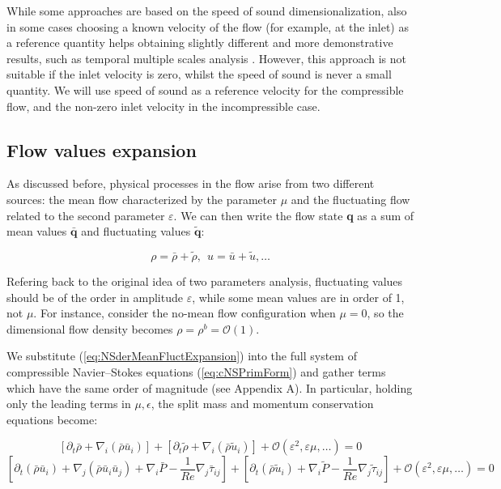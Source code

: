 While some approaches \cite{culick2006unsteady} are based on the speed of sound dimensionalization, also in some cases choosing a known velocity of the flow (for example, at the inlet) as a reference quantity helps obtaining slightly different and more demonstrative results, such as temporal multiple scales analysis \cite{Muller99lowmach}. However, this approach is not suitable if the inlet velocity is zero, whilst the speed of sound is never a small quantity. We will use speed of sound as a reference velocity for the compressible flow, and the non-zero inlet velocity in the incompressible case. 

\subsection{Flow values expansion}

As discussed before, physical processes in the flow arise from two different sources: the mean flow characterized by the parameter $\mu$ and the fluctuating flow related to the second parameter $\varepsilon$. We can then write the flow state \textbf{q} as a sum of mean values $\bar{\mathbf{q}}$ and fluctuating values $\tilde{\mathbf{q}}$:

\begin{equation}
\label{eq:NSderMeanFluctExpansion}
\rho = \bar{\rho} + \tilde{\rho}, \ \ u = \bar{u} + \tilde{u}, \dots
\end{equation}

Refering back to the original idea of two parameters analysis, fluctuating values should be of the order in amplitude $\varepsilon$, while some mean values are in order of 1, not $\mu$. For instance, consider the no-mean flow configuration when $\mu = 0$, so the dimensional flow density becomes $\rho = \rho^b = \mathcal{O}(1)$.

We substitute (\ref{eq:NSderMeanFluctExpansion}) into the full system of compressible Navier--Stokes equations (\ref{eq:cNSPrimForm}) and gather terms which have the same order of magnitude (see Appendix A). In particular, holding only the leading terms in $\mu, \epsilon$, the split mass and momentum conservation equations become:

\begin{equation}
\label{eq:NSderMassSplit}
\left[ \partial_t  \bar{\rho} + \nabla_i (\bar{\rho} \bar{u}_i) \right] + \left[ \partial_t  \tilde{\rho} + \nabla_i (\bar{\rho} \tilde{u}_i) \right] + \mathcal{O}(\varepsilon^2, \varepsilon \mu, \dots) = 0
\end{equation}
\begin{equation}
\label{eq:NSderMomenSplit}
\left[ \partial_t  (\bar{\rho} \bar{u}_i) + \nabla_j (\bar{\rho} \bar{u}_i\bar{u}_j) + \nabla_i \bar{P} - \frac{1}{Re} \nabla_j \bar{\tau}_{ij} \right] + \left[ \partial_t (\bar{\rho} \tilde{u}_i) + \nabla_i \tilde{P} - \frac{1}{Re} \nabla_j \tilde{\tau}_{ij} \right] +  \mathcal{O}(\varepsilon^2, \varepsilon \mu, \dots) = 0
\end{equation}


